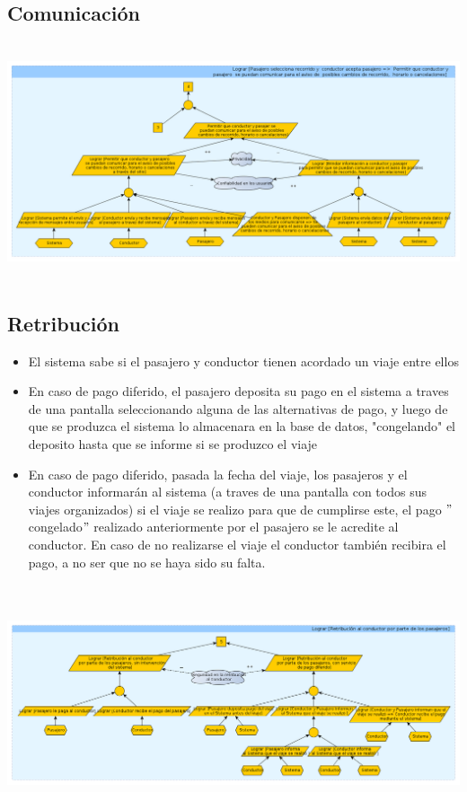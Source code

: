 \documentclass[a4paper,titlepage,10pt]{article}
\begin{document}
\subsection{Comunicaci\'on}
\includegraphics[height=7cm,width=19.5cm]{imagenes/Comunicacion.png}

\subsection{Retribuci\'on}
\begin{itemize}
\item El sistema sabe si el pasajero y conductor tienen acordado un viaje entre ellos
\item En caso de pago diferido, el pasajero deposita su pago en el sistema a traves de una pantalla seleccionando alguna de las alternativas de pago, y luego de que se produzca el sistema lo almacenara en la base de datos, "congelando" el deposito hasta que se informe si se produzco el viaje
\item En caso de pago diferido, pasada la fecha del viaje, los pasajeros y el conductor informarán al sistema (a traves de una pantalla con todos sus viajes organizados) si el viaje se realizo para que de cumplirse este, el pago $"$congelado$"$ realizado anteriormente por el pasajero se le acredite al conductor. En caso de no realizarse el viaje el conductor también recibira el pago, a no ser que no se haya sido su falta.
\end{itemize}
\includegraphics[height=7cm,width=19.5cm]{imagenes/Retribucion.png}
\end{document}
